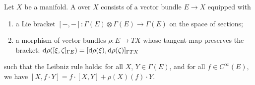 \begin{definition}\label{hda-0003}%
Let $X$ be a manifold. A  over $X$ consists of
a vector bundle $E\to X$ equipped with
\begin{enumerate}
\item a Lie bracket $[-,-]\colon\Gamma(E)\otimes\Gamma(E)\to\Gamma(E)$
  on the space of sections;
\item a morphism of vector bundles $\rho\colon E\to TX$ whose tangent
  map preserves the bracket: $\mathrm{d}\rho([\xi,\zeta]_{\Gamma E})=[\mathrm{d}\rho(\xi),\mathrm{d}\rho(\zeta)]_{\Gamma TX}$
\end{enumerate}
such that the Leibniz rule holds: for all $X$, $Y\in\Gamma(E)$, and for
all $f\in C^{\infty}(E)$, we have $[X,f\cdot Y]=f\cdot[X,Y]+\rho(X)(f)\cdot Y$.
\end{definition}

